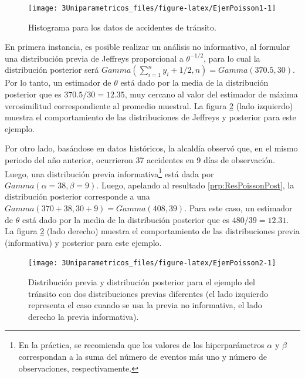 \documentclass[
  10pt,
  spanish,
]{book}
\theoremstyle{definition}
\theoremstyle{definition}
\theoremstyle{definition}
\theoremstyle{definition}
\theoremstyle{remark}
\begin{document}
\begin{figure}

{\centering \texttt{[image: 3Uniparametricos\_files/figure-latex/EjemPoisson1-1]} 

}

\caption{Histograma para los datos de accidentes de tránsito.}\label{fig:EjemPoisson1}
\end{figure}

En primera instancia, es posible realizar un análisis no informativo, al formular una distribución previa de Jeffreys proporcional a \(\theta^{-1/2}\), para lo cual la distribución posterior será \(Gamma(\sum_{i=1}^n y_i+1/2, n)=Gamma(370.5, 30)\). Por lo tanto, un estimador de \(\theta\) está dado por la media de la distribución posterior que es \(370.5/30=12.35\), muy cercano al valor del estimador de máxima verosimilitud correspondiente al promedio muestral. La figura \ref{fig:EjemPoisson2} (lado izquierdo) muestra el comportamiento de las distribuciones de Jeffreys y posterior para este ejemplo.

Por otro lado, basándose en datos históricos, la alcaldía observó que, en el mismo periodo del año anterior, ocurrieron 37 accidentes en 9 días de observación. Luego, una distribución previa informativa\footnote{En la práctica, se recomienda que los valores de los hiperparámetros \(\alpha\) y \(\beta\) correspondan a la suma del número de eventos más uno y número de observaciones, respectivamente.} está dada por \(Gamma(\alpha=38,\beta=9)\). Luego, apelando al resultado \ref{prp:ResPoissonPost}, la distribución posterior corresponde a una \(Gamma(370+38, 30+9)=Gamma(408, 39)\). Para este caso, un estimador de \(\theta\) está dado por la media de la distribución posterior que es \(480/39=12.31\). La figura \ref{fig:EjemPoisson2} (lado derecho) muestra el comportamiento de las distribuciones previa (informativa) y posterior para este ejemplo.

\begin{figure}

{\centering \texttt{[image: 3Uniparametricos\_files/figure-latex/EjemPoisson2-1]} 

}

\caption{Distribución previa y distribución posterior para el ejemplo del tránsito con dos distribuciones previas diferentes (el lado izquierdo representa el caso cuando se usa la previa no informativa, el lado derecho la previa informativa).}\label{fig:EjemPoisson2}
\end{figure}
\end{document}
